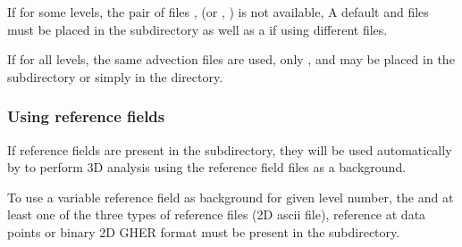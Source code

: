 If for some levels, the pair of files ,  (or , ) is not available, A default  and  files must be placed in the  subdirectory as well as a  if using different  files.

If for all levels, the same advection files are used, only ,  and  may be placed in the  subdirectory or simply in the  directory.


\begin{center}
\end{center}


\subsubsection{Using reference fields\label{divarefeuse}}


If reference fields are present in the  subdirectory, they will be used automatically by \diva to perform 3D analysis using the reference field files as a background.

To use a variable reference field as background for given level number, the  and at least one of the three types of reference files  (2D ascii file), reference at data points or  binary 2D GHER format must be present in the  subdirectory.

\begin{center}
\end{center}



